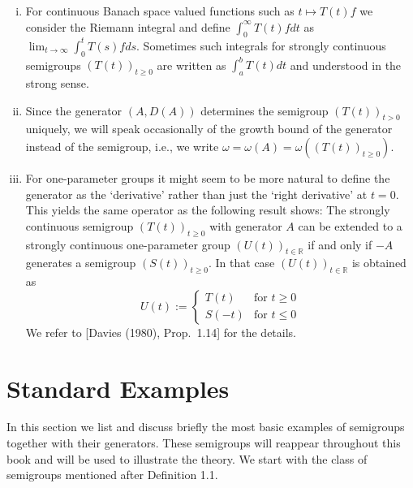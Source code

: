 \begin{remark}

\begin{enumerate}[(i)]

\item
For continuous Banach space valued functions such as $t \mapsto T(t)f$ we consider the Riemann integral and define $\int_0^\infty T(t)f dt$ as $\lim_{t \to \infty} \int_0^{t} T(s)f ds$.
Sometimes such integrals for strongly continuous semigroups $(T(t))_{t \geq 0}$ are written as $\int_{a}^{b} T(t)dt$ and understood in the strong sense.

\item Since the generator $(A,D(A))$ determines the semigroup $(T(t))_{t > 0}$ uniquely, we will speak occasionally of the growth bound of the generator instead of the semigroup, i.e., we write $\omega = \omega(A) = \omega((T(t))_{t \geq 0})$.

\item
For one-parameter groups it might seem to be more natural to define the generator as the `derivative' rather than just the `right derivative' at $t = 0$.
This yields the same operator as the following result shows:
The strongly continuous semigroup $(T(t))_{t \geq 0}$ with generator $A$ can be extended to a strongly continuous one-parameter group $(U(t))_{t \in \mathbb{R}}$ if and only if $-A$ generates a semigroup $(S(t))_{t \geq 0}$.
In that case $(U(t))_{t \in \mathbb{R}}$ is obtained as
\[
U(t) := \begin{cases}
T(t) & \text{for } t \geq 0 \\
S(-t) & \text{for } t \leq 0
\end{cases}
\]
We refer to [Davies (1980), Prop.~1.14] for the details.

\end{enumerate}
\end{remark}

\section{Standard Examples}
In this section we list and discuss briefly the most basic examples of semigroups together with their generators.
These semigroups will reappear throughout this book and will be used to illustrate the theory.
We start with the class of semigroups mentioned after Definition 1.1.
